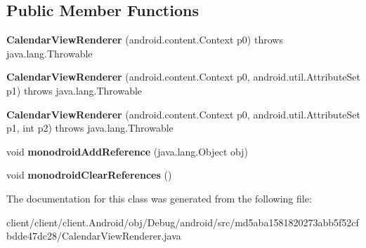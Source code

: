 \subsection*{Public Member Functions}
\begin{DoxyCompactItemize}
\item 
\hypertarget{classmd5aba1581820273abb5f52cfbdde47dc28_1_1CalendarViewRenderer_af8cf267fbd1dd7cb3568eb9fc3c8e608}{}{\bfseries Calendar\+View\+Renderer} (android.\+content.\+Context p0)  throws java.\+lang.\+Throwable 	\label{classmd5aba1581820273abb5f52cfbdde47dc28_1_1CalendarViewRenderer_af8cf267fbd1dd7cb3568eb9fc3c8e608}

\item 
\hypertarget{classmd5aba1581820273abb5f52cfbdde47dc28_1_1CalendarViewRenderer_a304d858556f808207fcd10ad35ec6953}{}{\bfseries Calendar\+View\+Renderer} (android.\+content.\+Context p0, android.\+util.\+Attribute\+Set p1)  throws java.\+lang.\+Throwable 	\label{classmd5aba1581820273abb5f52cfbdde47dc28_1_1CalendarViewRenderer_a304d858556f808207fcd10ad35ec6953}

\item 
\hypertarget{classmd5aba1581820273abb5f52cfbdde47dc28_1_1CalendarViewRenderer_a6f852f4eb9d291dedf8e18e66ded819c}{}{\bfseries Calendar\+View\+Renderer} (android.\+content.\+Context p0, android.\+util.\+Attribute\+Set p1, int p2)  throws java.\+lang.\+Throwable 	\label{classmd5aba1581820273abb5f52cfbdde47dc28_1_1CalendarViewRenderer_a6f852f4eb9d291dedf8e18e66ded819c}

\item 
\hypertarget{classmd5aba1581820273abb5f52cfbdde47dc28_1_1CalendarViewRenderer_a60b9f39c19869ed75fe0fbac398f0464}{}void {\bfseries monodroid\+Add\+Reference} (java.\+lang.\+Object obj)\label{classmd5aba1581820273abb5f52cfbdde47dc28_1_1CalendarViewRenderer_a60b9f39c19869ed75fe0fbac398f0464}

\item 
\hypertarget{classmd5aba1581820273abb5f52cfbdde47dc28_1_1CalendarViewRenderer_aee063aea400fb11495ad14ae4a74a63e}{}void {\bfseries monodroid\+Clear\+References} ()\label{classmd5aba1581820273abb5f52cfbdde47dc28_1_1CalendarViewRenderer_aee063aea400fb11495ad14ae4a74a63e}

\end{DoxyCompactItemize}


The documentation for this class was generated from the following file\+:\begin{DoxyCompactItemize}
\item 
client/client/client.\+Android/obj/\+Debug/android/src/md5aba1581820273abb5f52cfbdde47dc28/Calendar\+View\+Renderer.\+java\end{DoxyCompactItemize}
